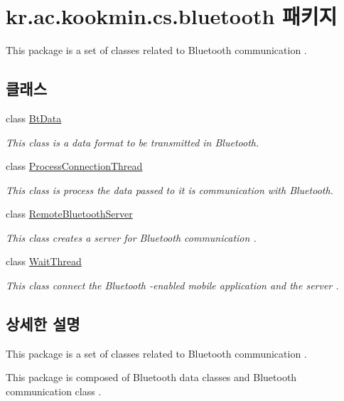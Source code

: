 \hypertarget{namespacekr_1_1ac_1_1kookmin_1_1cs_1_1bluetooth}{}\section{kr.\+ac.\+kookmin.\+cs.\+bluetooth 패키지}
\label{namespacekr_1_1ac_1_1kookmin_1_1cs_1_1bluetooth}


This package is a set of classes related to Bluetooth communication .  


\subsection*{클래스}
\begin{DoxyCompactItemize}
\item 
class \hyperlink{classkr_1_1ac_1_1kookmin_1_1cs_1_1bluetooth_1_1_bt_data}{Bt\+Data}
\begin{DoxyCompactList}\small\item\em This class is a data format to be transmitted in Bluetooth. \end{DoxyCompactList}\item 
class \hyperlink{classkr_1_1ac_1_1kookmin_1_1cs_1_1bluetooth_1_1_process_connection_thread}{Process\+Connection\+Thread}
\begin{DoxyCompactList}\small\item\em This class is process the data passed to it is communication with Bluetooth. \end{DoxyCompactList}\item 
class \hyperlink{classkr_1_1ac_1_1kookmin_1_1cs_1_1bluetooth_1_1_remote_bluetooth_server}{Remote\+Bluetooth\+Server}
\begin{DoxyCompactList}\small\item\em This class creates a server for Bluetooth communication . \end{DoxyCompactList}\item 
class \hyperlink{classkr_1_1ac_1_1kookmin_1_1cs_1_1bluetooth_1_1_wait_thread}{Wait\+Thread}
\begin{DoxyCompactList}\small\item\em This class connect the Bluetooth -\/enabled mobile application and the server . \end{DoxyCompactList}\end{DoxyCompactItemize}


\subsection{상세한 설명}
This package is a set of classes related to Bluetooth communication . 

This package is composed of Bluetooth data classes and Bluetooth communication class . 